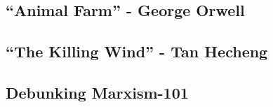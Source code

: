 \subsection{``Animal Farm'' - George Orwell}

\subsection{``The Killing Wind'' - Tan Hecheng}

\subsection{Debunking Marxism-101}

